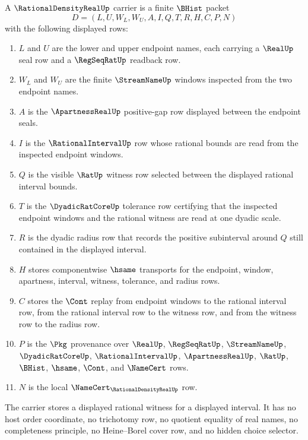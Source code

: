 \begin{definition}\label{def:rational-density-real-carrier}
A $\RationalDensityRealUp$ carrier is a finite $\BHist$ packet
$$
D=(L,U,W_L,W_U,A,I,Q,T,R,H,C,P,N)
$$
with the following displayed rows:
\begin{enumerate}
\item $L$ and $U$ are the lower and upper endpoint names, each carrying a $\RealUp$ seal row and a $\RegSeqRatUp$ readback row.
\item $W_L$ and $W_U$ are the finite $\StreamNameUp$ windows inspected from the two endpoint names.
\item $A$ is the $\ApartnessRealUp$ positive-gap row displayed between the endpoint seals.
\item $I$ is the $\RationalIntervalUp$ row whose rational bounds are read from the inspected endpoint windows.
\item $Q$ is the visible $\RatUp$ witness row selected between the displayed rational interval bounds.
\item $T$ is the $\DyadicRatCoreUp$ tolerance row certifying that the inspected endpoint windows and the rational witness are read at one dyadic scale.
\item $R$ is the dyadic radius row that records the positive subinterval around $Q$ still contained in the displayed interval.
\item $H$ stores componentwise $\hsame$ transports for the endpoint, window, apartness, interval, witness, tolerance, and radius rows.
\item $C$ stores the $\Cont$ replay from endpoint windows to the rational interval row, from the rational interval row to the witness row, and from the witness row to the radius row.
\item $P$ is the $\Pkg$ provenance over $\RealUp$, $\RegSeqRatUp$, $\StreamNameUp$, $\DyadicRatCoreUp$, $\RationalIntervalUp$, $\ApartnessRealUp$, $\RatUp$, $\BHist$, $\hsame$, $\Cont$, and $\NameCert$ rows.
\item $N$ is the local $\NameCert_{\RationalDensityRealUp}$ row.
\end{enumerate}
The carrier stores a displayed rational witness for a displayed interval. It has no host order coordinate, no trichotomy row, no quotient equality of real names, no completeness principle, no Heine--Borel cover row, and no hidden choice selector.
\end{definition}

